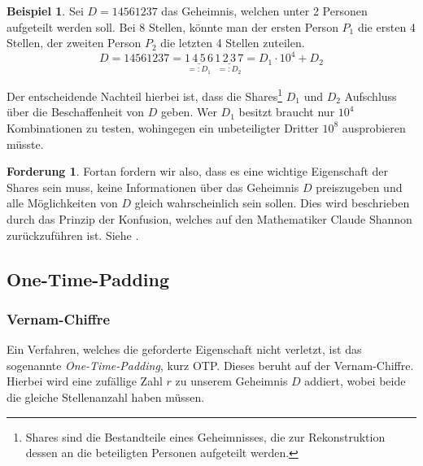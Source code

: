 \documentclass[12pt, a4paper, oneside, titlepage]{report}
\theoremstyle{definition}
\newtheorem{ford}[lemma]{Forderung}
\newtheorem{bsp}[lemma]{Beispiel}
\begin{document}
		\begin{bsp}
			Sei $ D = 14561237 $ das Geheimnis, welchen unter 2 Personen aufgeteilt werden soll. Bei 8 Stellen, könnte man der ersten Person $ P_1 $ die ersten 4 Stellen, der zweiten Person $ P_2 $ die letzten 4 Stellen zuteilen.
			$$ D = 14561237 = \underset{=:D_1}{\underline{1\,4\,5\,6}} \, \underset{=:D_2}{\underline{1\,2\,3\,7}} = D_1 \cdot 10^4 + D_2 $$
		\end{bsp}
		
		\noindent
		Der entscheidende Nachteil hierbei ist, dass die Shares\footnote{Shares sind die Bestandteile eines Geheimnisses, die zur Rekonstruktion dessen an die beteiligten Personen aufgeteilt werden.} $ D_1 $ und $ D_2 $ Aufschluss über die Beschaffenheit von $ D $ geben. Wer $ D_1 $ besitzt braucht nur $ 10^4 $ Kombinationen zu testen, wohingegen ein unbeteiligter Dritter $ 10^8 $ ausprobieren müsste.
		\begin{ford}
			Fortan fordern wir also, dass es eine wichtige Eigenschaft der Shares sein muss, keine Informationen über das Geheimnis $ D $ preiszugeben und alle Möglichkeiten von $ D $ gleich wahrscheinlich sein sollen. Dies wird beschrieben durch das Prinzip der Konfusion, welches auf den Mathematiker Claude Shannon zurückzuführen ist. Siehe \cite{shannon}.
		\end{ford}
		
	\subsection{One-Time-Padding}
	\subsubsection{Vernam-Chiffre}
		 Ein Verfahren, welches die geforderte Eigenschaft nicht verletzt, ist das sogenannte \emph{One-Time-Padding}, kurz OTP. Dieses beruht auf der Vernam-Chiffre. Hierbei wird eine zufällige Zahl $ r $ zu unserem Geheimnis $ D $  addiert, wobei beide die gleiche Stellenanzahl haben müssen. \cite{cobbe}
	
\end{document}

